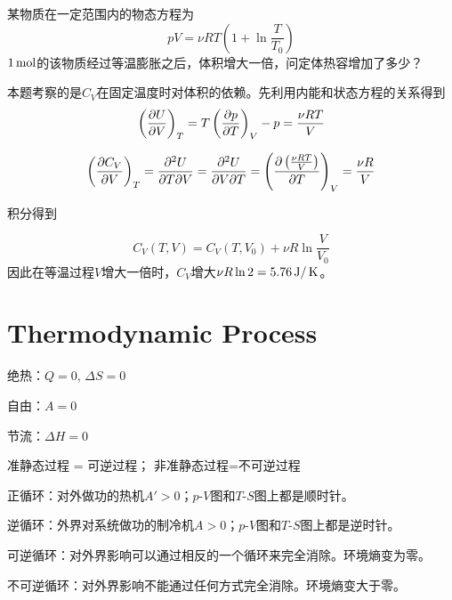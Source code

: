 \documentclass[CJK]{beamer}
\begin{document}
\begin{frame}
  \bch
  某物质在一定范围内的物态方程为
  $$ pV = \nu R T\left(1+\ln\frac{T}{T_0}\right) $$
  $1\,\mathrm{mol}$的该物质经过等温膨胀之后，体积增大一倍，问定体热容增加了多少？
  \ech
\end{frame}

\begin{frame}
  \bch
  {\scriptsize
    本题考察的是$C_V$在固定温度时对体积的依赖。先利用内能和状态方程的关系得到
    $$\left(\frac{\partial U}{\partial V}\right)_{T} = T\left(\frac{\partial p}{\partial T}\right)_{V} - p = \frac{\nu RT}{V} $$
    
  $$\left(\frac{\partial C_V}{\partial V}\right)_{T} = \frac{\partial^2U}{\partial T\partial V} = \frac{\partial^2U}{\partial V\partial T} = \left(\frac{\partial \left(\frac{\nu RT}{V}\right)}{\partial T}\right)_{V} =\frac{\nu R}{V} $$

    积分得到

    $$ C_V(T, V) = C_V(T, V_0) + \nu R \ln\frac{V}{V_0}$$
    因此在等温过程$V$增大一倍时，$C_V$增大$\nu R \ln 2 = 5.76 \,\mathrm{J}/\,\mathrm{K}$。

  }
  \ech
\end{frame}


\section{Thermodynamic Process}

\begin{frame}
\end{frame}

\begin{frame}
  \bch
  \bitem
\item{绝热：$Q  = 0$,  $\Delta S = 0$}
\item{自由：$A=0$}
\item{节流：$\Delta H = 0$}
\item{准静态过程 = 可逆过程； 非准静态过程=不可逆过程}
\item{正循环：对外做功的热机$A'>0$；$p$-$V$图和$T$-$S$图上都是顺时针。}
\item{逆循环：外界对系统做功的制冷机$A>0$；$p$-$V$图和$T$-$S$图上都是逆时针。}
\item{可逆循环：对外界影响可以通过相反的一个循环来完全消除。环境熵变为零。}
\item{不可逆循环：对外界影响不能通过任何方式完全消除。环境熵变大于零。}
\eitem
  \ech  
\end{frame}
\end{document}
